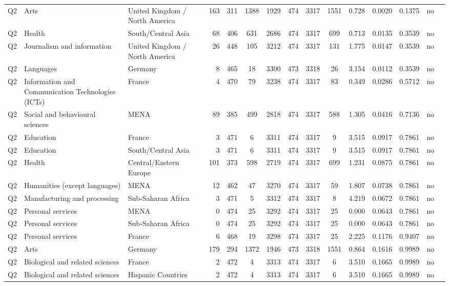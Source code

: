 \begin{longtable}{lllrcccccccccll}
Q2 & Arts & United Kingdom / North America & 163 & 311 & 1388 & 1929 & 474 & 3317 & 1551 & 0.728 & 0.0020 & 0.1375 & no \\
Q2 & Health & South/Central Asia & 68 & 406 & 631 & 2686 & 474 & 3317 & 699 & 0.713 & 0.0135 & 0.3539 & no \\
Q2 & Journalism and information & United Kingdom / North America & 26 & 448 & 105 & 3212 & 474 & 3317 & 131 & 1.775 & 0.0147 & 0.3539 & no \\
Q2 & Languages & Germany & 8 & 465 & 18 & 3300 & 473 & 3318 & 26 & 3.154 & 0.0112 & 0.3539 & no \\
Q2 & Information and Communication Technologies (ICTs) & France & 4 & 470 & 79 & 3238 & 474 & 3317 & 83 & 0.349 & 0.0286 & 0.5712 & no \\
Q2 & Social and behavioural sciences & MENA & 89 & 385 & 499 & 2818 & 474 & 3317 & 588 & 1.305 & 0.0416 & 0.7136 & no \\
Q2 & Education & France & 3 & 471 & 6 & 3311 & 474 & 3317 & 9 & 3.515 & 0.0917 & 0.7861 & no \\
Q2 & Education & South/Central Asia & 3 & 471 & 6 & 3311 & 474 & 3317 & 9 & 3.515 & 0.0917 & 0.7861 & no \\
Q2 & Health & Central/Eastern Europe & 101 & 373 & 598 & 2719 & 474 & 3317 & 699 & 1.231 & 0.0875 & 0.7861 & no \\
Q2 & Humanities (except languages) & MENA & 12 & 462 & 47 & 3270 & 474 & 3317 & 59 & 1.807 & 0.0738 & 0.7861 & no \\
Q2 & Manufacturing and processing & Sub-Saharan Africa & 3 & 471 & 5 & 3312 & 474 & 3317 & 8 & 4.219 & 0.0672 & 0.7861 & no \\
Q2 & Personal services & MENA & 0 & 474 & 25 & 3292 & 474 & 3317 & 25 & 0.000 & 0.0643 & 0.7861 & no \\
Q2 & Personal services & Sub-Saharan Africa & 0 & 474 & 25 & 3292 & 474 & 3317 & 25 & 0.000 & 0.0643 & 0.7861 & no \\
Q2 & Personal services & France & 6 & 468 & 19 & 3298 & 474 & 3317 & 25 & 2.225 & 0.1176 & 0.9407 & no \\
Q2 & Arts & Germany & 179 & 294 & 1372 & 1946 & 473 & 3318 & 1551 & 0.864 & 0.1616 & 0.9989 & no \\
Q2 & Biological and related sciences & France & 2 & 472 & 4 & 3313 & 474 & 3317 & 6 & 3.510 & 0.1665 & 0.9989 & no \\
Q2 & Biological and related sciences & Hispanic Countries & 2 & 472 & 4 & 3313 & 474 & 3317 & 6 & 3.510 & 0.1665 & 0.9989 & no \\

\end{longtable}
